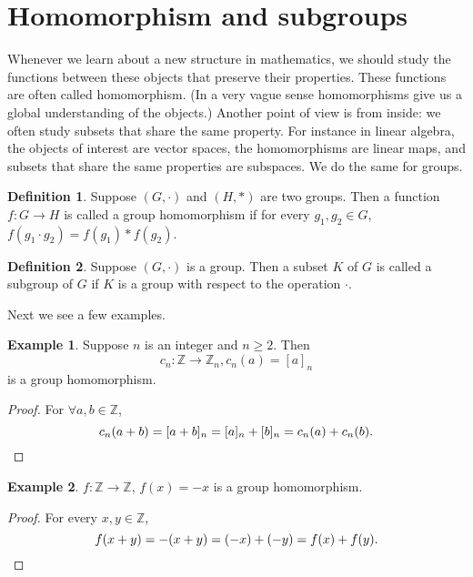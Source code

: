 \documentclass{article}
\theoremstyle{plain}
\theoremstyle{definition}
\newtheorem*{definition}{Definition}
\newtheorem{example}{Example}
\begin{document}







\section{Homomorphism and subgroups}

Whenever we learn about a new structure in mathematics, we 
should study the functions between these objects that preserve
their properties. These functions are often called homomorphism.
(In a very vague sense homomorphisms give us a global understanding
of the objects.) Another point of view is from inside:
we often study subsets that share the same property. For
instance in linear algebra, the objects of interest are vector
spaces, the homomorphisms are linear maps, and subsets that
share the same properties are subspaces. We do the same for groups.

\begin{definition}
    Suppose $(G,\cdot)$ and $(H,*)$ are two groups.
    Then a function $f:G\to H$ is called a group homomorphism if 
    for every $g_1,g_2\in G$, $f(g_1\cdot g_2)=f(g_1)*f(g_2)$.
\end{definition}

\begin{definition}
    Suppose $(G,\cdot)$ is a group. Then a subset $K$ of $G$
    is called a subgroup of $G$ if $K$ is a group with respect to the
    operation $\cdot$.
\end{definition}

Next we see a few examples.

\begin{example}
    Suppose $n$ is an integer and $n\geq 2$. Then
    \[c_n:\mathbb{Z}\to\mathbb{Z}_n,c_n(a)=[a]_n\]
    is a group homomorphism.
\end{example}

\begin{proof}
    For $\forall a,b\in\mathbb{Z}$,
    \[c_n(a+b)=[a+b]_n=[a]_n+[b]_n=c_n(a)+c_n(b).\qedhere\]
\end{proof}

\begin{example}
    $f:\mathbb{Z}\to\mathbb{Z}$, $f(x)=-x$ is a group homomorphism.
\end{example}

\begin{proof}
    For every $x,y\in\mathbb{Z}$,
    \[f(x+y)=-(x+y)=(-x)+(-y)=f(x)+f(y).\qedhere\]
\end{proof}
\end{document}
